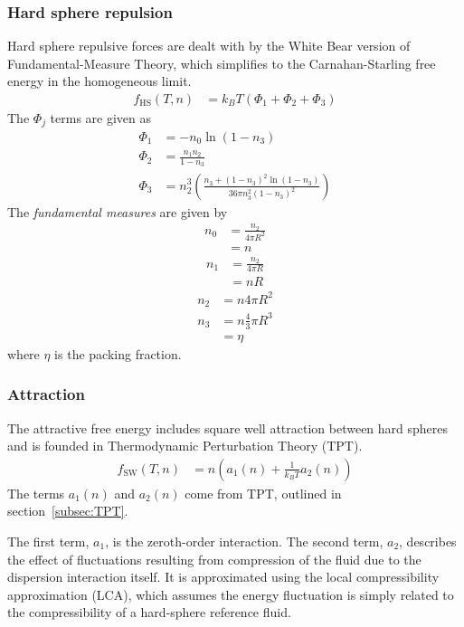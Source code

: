 \documentclass[letterpaper,twocolumn,amsmath,amssymb,prb]{revtex4-1}
\newcommand{\kT}{\ensuremath{k_BT}}
\newcommand{\fhs}{\ensuremath{f_\text{HS}(T,n)}}
\newcommand{\fsw}{\ensuremath{f_\text{SW}(T,n)}}
\begin{document}
\subsubsection{Hard sphere repulsion}\label{sub2sec:HS}
Hard sphere repulsive forces are dealt with by the White Bear version
of Fundamental-Measure Theory,\cite{Roth02} which simplifies to the
Carnahan-Starling free energy\cite{Carnahan69} in the homogeneous limit.
\begin{align}
  \fhs &= \kT\left( \Phi_1 + \Phi_2 + \Phi_3 \right)
\end{align}
The $\Phi_j$ terms are given as
\begin{align}
  \Phi_1 &= -n_0\ln(1 - n_3) \\
  \Phi_2 &= \frac{n_1n_2}{1 - n_3} \\
  \Phi_3 &= n_2^3\left( \frac{n_3 + (1 - n_3)^2\ln(1 - n_3)}{36\pi n_3^2(1 - n_3)^2} \right)
\end{align}
The \emph{fundamental measures} are given by
\begin{align}
  n_0 &= \frac{n_2}{4\pi R^2} \nonumber \\
  &= n
\end{align}
\begin{align}
  n_1 &= \frac{n_2}{4\pi R} \nonumber \\
  &= nR
\end{align}
\begin{align}
  n_2 &= n4\pi R^2
\end{align}
\begin{align}
  n_3 &= n\frac{4}{3}\pi R^3 \nonumber \\
  &= \eta \label{eqn:packingFrac}
\end{align}
where $\eta$ is the packing fraction.

\subsubsection{Attraction}\label{sub2sec:disp}
The attractive free energy includes square well attraction between
hard spheres and is founded in Thermodynamic Perturbation Theory
(TPT).
\begin{align}
  \fsw &= n \left( a_1(n) + \frac{1}{\kT}a_2(n) \right)
\end{align}
The terms $a_1(n)$ and $a_2(n)$ come from TPT, outlined in section~\ref{subsec:TPT}.

The first term, $a_1$, is the zeroth-order interaction. The
second term, $a_2$, describes the effect of fluctuations resulting
from compression of the fluid due to the dispersion interaction
itself. It is approximated using the local compressibility
approximation (LCA), which assumes the energy fluctuation is simply
related to the compressibility of a hard-sphere reference
fluid.\cite{Barker76}
\end{document}
